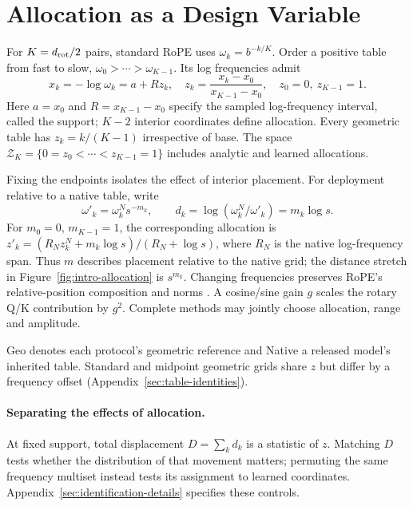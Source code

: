 \section{Allocation as a Design Variable}
\label{sec:exponents}\label{sec:identification}
For $K=d_{\rm rot}/2$ pairs, standard RoPE uses $\omega_k=b^{-k/K}$.
Order a positive table from fast to slow, $\omega_0>\cdots>\omega_{K-1}$.
Its log frequencies admit
\begin{equation}
x_k=-\log\omega_k=a+Rz_k,\quad z_k=\frac{x_k-x_0}{x_{K-1}-x_0},\quad z_0=0,\ z_{K-1}=1.
\label{eq:table-decomposition}
\end{equation}
Here $a=x_0$ and $R=x_{K-1}-x_0$ specify the sampled log-frequency interval,
called the support; $K-2$ interior coordinates define allocation. Every
geometric table has $z_k=k/(K-1)$ irrespective of base. The space
$\mathcal Z_K=\{0=z_0<\cdots<z_{K-1}=1\}$ includes analytic and learned allocations.

Fixing the endpoints isolates the effect of interior placement.
For deployment relative to a native table, write
\begin{equation}
\omega'_k=\omega_k^N s^{-m_k},\qquad d_k=\log(\omega_k^N/\omega'_k)=m_k\log s.
\label{eq:movement-allocation}
\end{equation}
For $m_0=0$, $m_{K-1}=1$, the corresponding allocation is
$z'_k=(R_Nz_k^N+m_k\log s)/(R_N+\log s)$, where $R_N$ is the native
log-frequency span. Thus $m$ describes placement relative to the native grid;
the distance stretch in Figure~\ref{fig:intro-allocation} is $s^{m_k}$.
Changing frequencies preserves RoPE's relative-position composition and norms
\citep{su2024roformer}. A cosine/sine gain $g$ scales the rotary Q/K contribution
by $g^2$. Complete methods may jointly choose allocation, range and amplitude.

Geo denotes each protocol's geometric reference and Native a released model's
inherited table. Standard and midpoint geometric grids share $z$ but differ by
a frequency offset (Appendix~\ref{sec:table-identities}).

\paragraph{Separating the effects of allocation.}
At fixed support, total displacement $D=\sum_kd_k$ is a statistic of $z$.
Matching $D$ tests whether the distribution of that movement matters;
permuting the same frequency multiset instead tests its assignment to learned
coordinates. Appendix~\ref{sec:identification-details}
specifies these controls.
